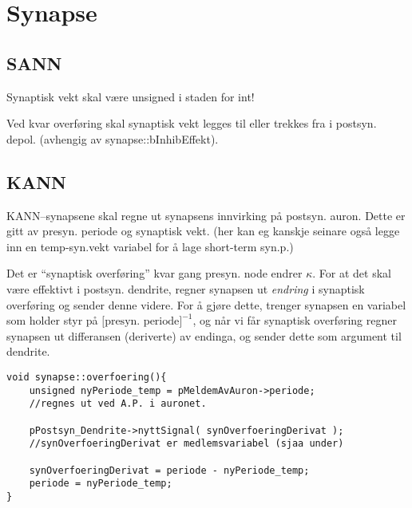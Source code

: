 
\section{Synapse}

\subsection{SANN}
Synaptisk vekt skal være unsigned i staden for int!

Ved kvar overføring skal synaptisk vekt legges til eller trekkes fra i postsyn. depol. (avhengig av synapse::bInhibEffekt). 

%


\subsection{KANN}
KANN--synapsene skal regne ut synapsens innvirking på postsyn. auron. Dette er gitt av presyn. periode og synaptisk vekt. (her kan eg kanskje seinare også legge inn en temp-syn.vekt variabel for å lage short-term syn.p.)

Det er ``synaptisk overføring'' kvar gang presyn. node endrer $\kappa$. 
For at det skal være effektivt i postsyn. dendrite, regner synapsen ut \emph{endring} i synaptisk overføring og sender denne videre. 
For å gjøre dette, trenger synapsen en variabel som holder styr på $\text{[presyn. periode]}^{-1}$, og når vi får synaptisk overføring regner synapsen ut differansen (deriverte) av endinga, og sender dette som argument til dendrite.

\begin{lstlisting}
void synapse::overfoering(){
	unsigned nyPeriode_temp = pMeldemAvAuron->periode; 
	//regnes ut ved A.P. i auronet.
	
	pPostsyn_Dendrite->nyttSignal( synOverfoeringDerivat );  
	//synOverfoeringDerivat er medlemsvariabel (sjaa under)
	
	synOverfoeringDerivat = periode - nyPeriode_temp;
	periode = nyPeriode_temp;
}
\end{lstlisting}

